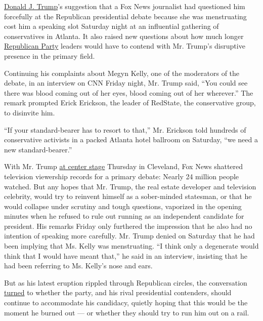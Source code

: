 \href{http://www.nytimes3xbfgragh.onion/interactive/2015/06/16/us/elections/donald-trump.html?inline=nyt-per}{Donald
J. Trump}'s suggestion that a Fox News journalist had questioned him
forcefully at the Republican presidential debate because she was
menstruating cost him a speaking slot Saturday night at an influential
gathering of conservatives in Atlanta. It also raised new questions
about how much longer
\href{http://topics.nytimes3xbfgragh.onion/top/reference/timestopics/organizations/r/republican_party/index.html?inline=nyt-org}{Republican
Party} leaders would have to contend with Mr. Trump's disruptive
presence in the primary field.

Continuing his complaints about Megyn Kelly, one of the moderators of
the debate, in an interview on CNN Friday night, Mr. Trump said, ``You
could see there was blood coming out of her eyes, blood coming out of
her wherever.'' The remark prompted Erick Erickson, the leader of
RedState, the conservative group, to disinvite him.

``If your standard-bearer has to resort to that,'' Mr. Erickson told
hundreds of conservative activists in a packed Atlanta hotel ballroom on
Saturday, ``we need a new standard-bearer.''

With Mr. Trump
\href{http://www.nytimes3xbfgragh.onion/2015/08/07/us/politics/rivals-jab-at-donald-trump-as-gop-debate-becomes-testy.html}{at
center stage} Thursday in Cleveland, Fox News shattered television
viewership records for a primary debate: Nearly 24 million people
watched. But any hopes that Mr. Trump, the real estate developer and
television celebrity, would try to reinvent himself as a sober-minded
statesman, or that he would collapse under scrutiny and tough questions,
vaporized in the opening minutes when he refused to rule out running as
an independent candidate for president. His remarks Friday only
furthered the impression that he also had no intention of speaking more
carefully. Mr. Trump denied on Saturday that he had been implying that
Ms. Kelly was menstruating. ``I think only a degenerate would think that
I would have meant that,'' he said in an interview, insisting that he
had been referring to Ms. Kelly's nose and ears.

But as his latest eruption rippled through Republican circles, the
conversation
\href{http://www.nytimes3xbfgragh.onion/2015/08/08/us/politics/candidates-continue-to-plead-their-cases-after-first-republican-debate.html}{turned}
to whether the party, and his rival presidential contenders, should
continue to accommodate his candidacy, quietly hoping that this would be
the moment he burned out --- or whether they should try to run him out
on a rail.

